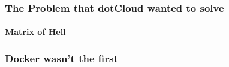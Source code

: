 \documentclass[mathserif,serif]{beamer}
\begin{document}
    \begin{frame}
        \frametitle{The Problem that dotCloud wanted to solve}
        \framesubtitle{Matrix of Hell}
        \begin{center}
        \end{center}
    \end{frame}

    \begin{frame}
        \frametitle{Docker wasn't the first}
        \begin{center}
        \end{center}
    \end{frame}
\end{document}
